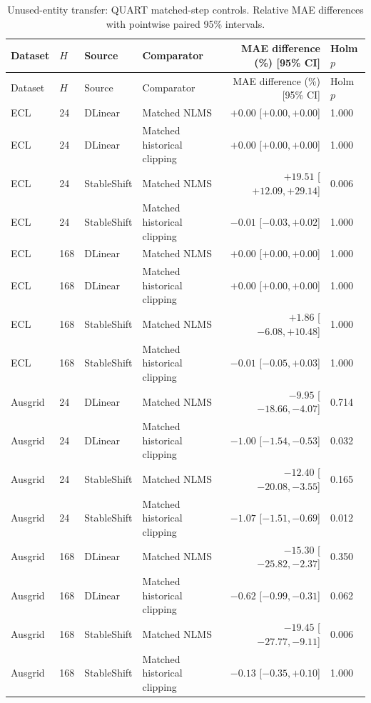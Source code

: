 \begin{longtable}{lllp{}rp{}}
\caption{Unused-entity transfer: QUART matched-step controls. Relative MAE differences with pointwise paired 95\% intervals.}\label{tab:withheld_matched_mechanism}\\
\toprule
Dataset & $H$ & Source & Comparator & MAE difference (\%) [95\% CI] & Holm $p$\\
\midrule
\endfirsthead
\toprule
Dataset & $H$ & Source & Comparator & MAE difference (\%) [95\% CI] & Holm $p$\\
\midrule
\endhead
ECL & 24 & DLinear & Matched NLMS & $+0.00$ [$ +0.00, +0.00 $] & 1.000\\
ECL & 24 & DLinear & Matched historical clipping & $+0.00$ [$ +0.00, +0.00 $] & 1.000\\
ECL & 24 & StableShift & Matched NLMS & $+19.51$ [$ +12.09, +29.14 $] & 0.006\\
ECL & 24 & StableShift & Matched historical clipping & $-0.01$ [$ -0.03, +0.02 $] & 1.000\\
ECL & 168 & DLinear & Matched NLMS & $+0.00$ [$ +0.00, +0.00 $] & 1.000\\
ECL & 168 & DLinear & Matched historical clipping & $+0.00$ [$ +0.00, +0.00 $] & 1.000\\
ECL & 168 & StableShift & Matched NLMS & $+1.86$ [$ -6.08, +10.48 $] & 1.000\\
ECL & 168 & StableShift & Matched historical clipping & $-0.01$ [$ -0.05, +0.03 $] & 1.000\\
Ausgrid & 24 & DLinear & Matched NLMS & $-9.95$ [$ -18.66, -4.07 $] & 0.714\\
Ausgrid & 24 & DLinear & Matched historical clipping & $-1.00$ [$ -1.54, -0.53 $] & 0.032\\
Ausgrid & 24 & StableShift & Matched NLMS & $-12.40$ [$ -20.08, -3.55 $] & 0.165\\
Ausgrid & 24 & StableShift & Matched historical clipping & $-1.07$ [$ -1.51, -0.69 $] & 0.012\\
Ausgrid & 168 & DLinear & Matched NLMS & $-15.30$ [$ -25.82, -2.37 $] & 0.350\\
Ausgrid & 168 & DLinear & Matched historical clipping & $-0.62$ [$ -0.99, -0.31 $] & 0.062\\
Ausgrid & 168 & StableShift & Matched NLMS & $-19.45$ [$ -27.77, -9.11 $] & 0.006\\
Ausgrid & 168 & StableShift & Matched historical clipping & $-0.13$ [$ -0.35, +0.10 $] & 1.000\\
\bottomrule
\end{longtable}
